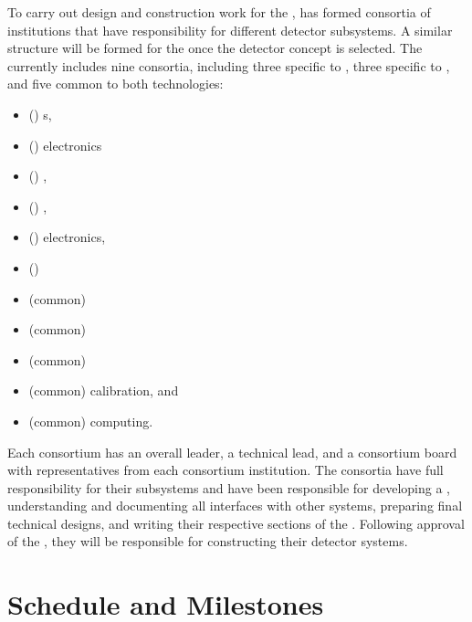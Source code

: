 To carry out design and construction work for the  ,  has  formed consortia of institutions that have responsibility for different detector subsystems. A similar structure will be formed for the   once the detector concept is selected. The   currently includes nine consortia, including three specific to , three specific to , and five common to both technologies:
\begin{itemize}
\item (\single) s, %
\item (\single)  electronics %
\item (\single) , %
\item (\dual) , %
\item (\dual)  electronics, %
\item (\dual)  %
\item (common)  %
\item (common)  %
\item (common)  %
\item (common) calibration,  and %
\item (common) computing.
\end{itemize} 
 Each consortium has an overall leader, a technical lead, and a consortium board with representatives from each consortium institution. The consortia have full responsibility for their subsystems and have been responsible for developing a , understanding and documenting all interfaces with other systems, preparing final technical designs, and writing their respective sections of the . Following approval of the  , they will be responsible for constructing their detector systems. %


\section{Schedule and Milestones} 

